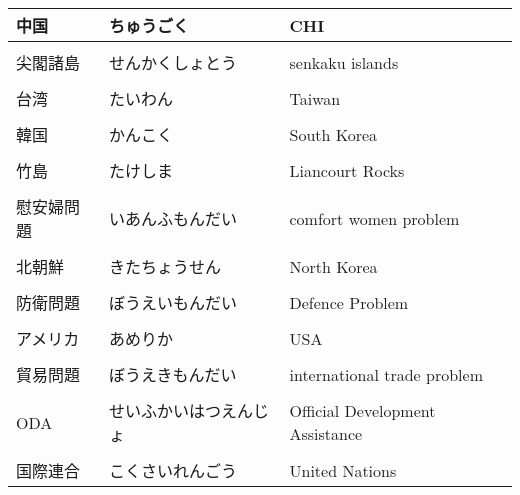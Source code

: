 \documentclass{article}
\begin{document}
\begin{tabular}{  l | l | p{7.5cm} }
 中国					& ちゅうごく				& CHI 									\\ \hline \\[-1em]
 尖閣諸島					& せんかくしょとう			& senkaku islands　						\\ \hline \\[-1em]
 台湾					& たいわん				& Taiwan 								\\ \hline \\[-1em]
 韓国					& かんこく 				& South Korea							\\ \hline \\[-1em]
 竹島					& たけしま				& Liancourt Rocks 						\\ \hline \\[-1em]
 慰安婦問題				& いあんふもんだい		& comfort women problem					\\ \hline \\[-1em]
 北朝鮮					& きたちょうせん			& North Korea 							\\ \hline \\[-1em]
 防衛問題					& ぼうえいもんだい		& Defence Problem						\\ \hline \\[-1em]
 アメリカ					& あめりか				& USA	 								\\ \hline \\[-1em]
 貿易問題					& ぼうえきもんだい		& international trade problem			\\ \hline \\[-1em]
 ODA					& せいふかいはつえんじょ 	& Official Development Assistance 		\\ \hline \\[-1em]
 国際連合					& こくさいれんごう 		& United Nations 						%
\end{tabular}
\end{document}
